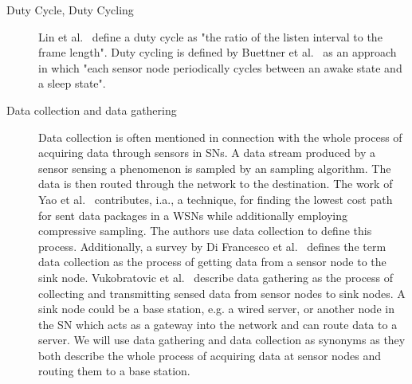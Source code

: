 \begin{description}
    \item[Duty Cycle, Duty Cycling]
        Lin et al.~\cite{lin2004medium} define a duty cycle as "the ratio of
        the listen interval to the frame length". Duty cycling is defined by
        Buettner et al.~\cite{buettner2006x} as an approach in which "each
        sensor node periodically cycles between an awake state and a sleep
        state".


    \item[Data collection and data gathering] 
        Data collection is often mentioned in connection with the whole process
        of acquiring data through sensors in \acp{SN}. A data stream produced
        by a sensor sensing a phenomenon is sampled by an sampling algorithm.
        The data is then routed through the network to the destination. The
        work of Yao et al.~\cite{yao2015edal} contributes, i.a., a technique,
        for finding the lowest cost path for sent data packages in a \acp{WSN}
        while additionally employing compressive sampling. The authors use data
        collection to define this process. Additionally, a survey by Di
        Francesco et al.~\cite{di2011data} defines the term data collection as
        the process of getting data from a sensor node to the sink node.
        Vukobratovic et al.~\cite{vukobratovic2010rateless, zhang2016data}
        describe data gathering as the process of collecting and transmitting
        sensed data from sensor nodes to sink nodes. A sink node could be a
        base station, e.g. a wired server, or another node in the \ac{SN} which
        acts as a gateway into the network and can route data to a server. We
        will use data gathering and data collection as synonyms as they both
        describe the whole process of acquiring data at sensor nodes and
        routing them to a base station.


\end{description}
